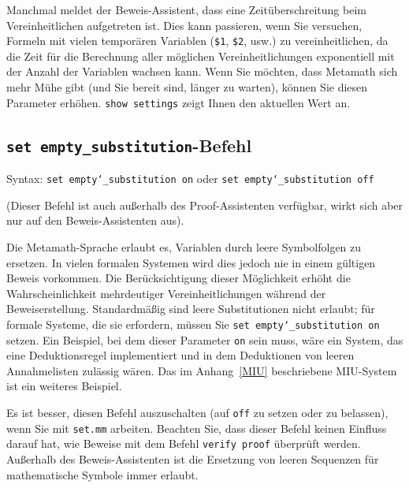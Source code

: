 Manchmal meldet der Beweis-Assistent, dass eine Zeitüberschreitung beim Vereinheitlichen aufgetreten ist.  Dies kann passieren, wenn Sie versuchen, Formeln mit vielen temporären Variablen (\texttt{\$1}, \texttt{\$2}, usw.) zu vereinheitlichen, da die Zeit für die Berechnung aller möglichen Vereinheitlichungen exponentiell mit der Anzahl der Variablen wachsen kann.  Wenn Sie möchten, dass Metamath sich mehr Mühe gibt (und Sie bereit sind, länger zu warten), können Sie diesen Parameter erhöhen.  \texttt{show settings} zeigt Ihnen den aktuellen Wert an. 


\subsection{\texttt{set empty\_substitution}-Befehl}

\begin{flushleft}
Syntax:  \texttt{set empty{\char`\_}substitution on} oder \texttt{set
empty{\char`\_}substitution off}
\end{flushleft}

(Dieser Befehl ist auch außerhalb des Proof-Assistenten verfügbar, wirkt sich aber nur auf den Beweis-Assistenten aus). 

Die Metamath-Sprache erlaubt es, Variablen durch leere Symbolfolgen zu ersetzen.  In vielen formalen Systemen wird dies jedoch nie in einem gültigen Beweis vorkommen.  Die Berücksichtigung dieser Möglichkeit erhöht die Wahrscheinlichkeit mehrdeutiger Vereinheitlichungen während der Beweiserstellung. Standardmäßig sind leere Substitutionen nicht erlaubt; für formale Systeme, die sie erfordern, müssen Sie \texttt{set empty{\char`\_}substitution on} setzen. Ein Beispiel, bei dem dieser Parameter \texttt{on} sein muss, wäre ein System, das eine Deduktionsregel implementiert und in dem Deduktionen von leeren Annahmelisten zulässig wären.  Das im Anhang~\ref{MIU} beschriebene MIU-System ist ein weiteres Beispiel.

Es ist besser, diesen Befehl auszuschalten (auf \texttt{off} zu setzen oder zu belassen), wenn Sie mit \texttt{set.mm} arbeiten. Beachten Sie, dass dieser Befehl keinen Einfluss darauf hat, wie Beweise mit dem Befehl \texttt{verify proof} überprüft werden.  Außerhalb des Beweis-Assistenten ist die Ersetzung von leeren Sequenzen für mathematische Symbole immer erlaubt. 


